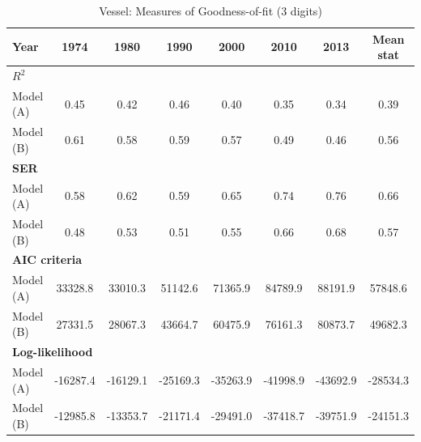 \documentclass[a4paper,11pt]{article}
\begin{document}
\begin{table}[htbp]
  \centering
  \caption{Vessel: Measures of Goodness-of-fit (3 digits)}
    \footnotesize{
\begin{center}
\begin{tabular}{l|cccccc|c}
\hline \hline
Year  & \multicolumn{1}{c}{1974} & \multicolumn{1}{c}{1980} & \multicolumn{1}{c}{1990} & \multicolumn{1}{c}{2000} & 2010  & \multicolumn{1}{c}{2013} & Mean stat \\ \hline
\multicolumn{8}{l}{\bf{$R^2$} }\\ \hline
Model (A)& \multicolumn{1}{c}{0.45} & \multicolumn{1}{c}{0.42} & \multicolumn{1}{c}{0.46} & \multicolumn{1}{c}{0.40} & 0.35 & \multicolumn{1}{c}{0.34} & 0.39 \\
  Model (B) & \multicolumn{1}{c}{0.61} & \multicolumn{1}{c}{0.58} & \multicolumn{1}{c}{0.59} & \multicolumn{1}{c}{0.57} & 0.49 & \multicolumn{1}{c}{0.46} & 0.56 \\ \hline
\multicolumn{8}{l}{\textbf{SER}  }  \\ \hline
    Model (A) & \multicolumn{1}{c}{0.58} & \multicolumn{1}{c}{0.62} & \multicolumn{1}{c}{0.59} & \multicolumn{1}{c}{0.65} & 0.74  & \multicolumn{1}{c}{0.76} & 0.66 \\
    Model (B) & \multicolumn{1}{c}{0.48} & \multicolumn{1}{c}{0.53} & \multicolumn{1}{c}{0.51} & \multicolumn{1}{c}{0.55} & 0.66  & \multicolumn{1}{c}{0.68} & 0.57 \\ \hline
   \multicolumn{8}{l}{\textbf{AIC criteria}}  \\ \hline
   Model (A) & \multicolumn{1}{c}{33328.8} & \multicolumn{1}{c}{33010.3} & \multicolumn{1}{c}{51142.6} & \multicolumn{1}{c}{71365.9} & 84789.9 & \multicolumn{1}{c}{88191.9} & 57848.6 \\
   Model (B) & \multicolumn{1}{c}{27331.5} & \multicolumn{1}{c}{28067.3} & \multicolumn{1}{c}{43664.7} & \multicolumn{1}{c}{60475.9} & 76161.3 & \multicolumn{1}{c}{80873.7} & 49682.3 \\ \hline
    \multicolumn{8}{l}{\textbf{Log-likelihood}} \\ \hline
    Model (A) & \multicolumn{1}{c}{-16287.4} & \multicolumn{1}{c}{-16129.1} & \multicolumn{1}{c}{-25169.3} & \multicolumn{1}{c}{-35263.9} & -41998.9 & \multicolumn{1}{c}{-43692.9} & -28534.3 \\
    Model (B) & \multicolumn{1}{c}{-12985.8} & \multicolumn{1}{c}{-13353.7} & \multicolumn{1}{c}{-21171.4} & \multicolumn{1}{c}{-29491.0} & -37418.7 & \multicolumn{1}{c}{-39751.9} & -24151.3 \\

\end{tabular}
\end{center}}
\end{table}
\end{document}
